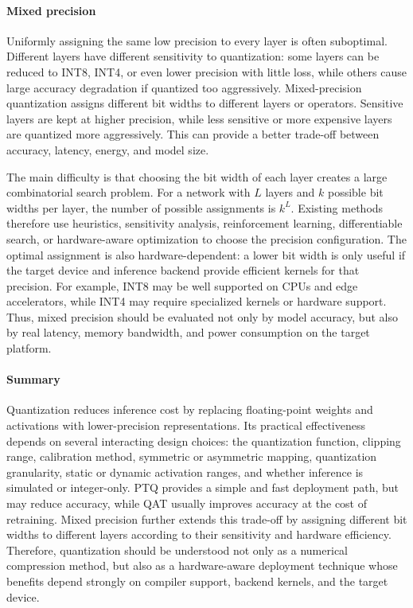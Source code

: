 \documentclass[12pt,a4paper]{report}
\begin{document}
\paragraph{Mixed precision}
Uniformly assigning the same low precision to every layer is often suboptimal. Different layers
have different sensitivity to quantization: some layers can be reduced to INT8, INT4, or even
lower precision with little loss, while others cause large accuracy degradation if quantized too
aggressively. Mixed-precision quantization assigns different bit widths to different layers or
operators. Sensitive layers are kept at higher precision, while less sensitive or more expensive
layers are quantized more aggressively. This can provide a better trade-off between accuracy,
latency, energy, and model size.

The main difficulty is that choosing the bit width of each layer creates a large combinatorial search
problem. For a network with $L$ layers and $k$ possible bit widths per layer, the number of
possible assignments is $k^L$. Existing methods therefore use heuristics, sensitivity analysis,
reinforcement learning, differentiable search, or hardware-aware optimization to choose the
precision configuration. The optimal assignment is also hardware-dependent: a lower bit width is
only useful if the target device and inference backend provide efficient kernels for that precision.
For example, INT8 may be well supported on CPUs and edge accelerators, while INT4 may require
specialized kernels or hardware support. Thus, mixed precision should be evaluated not only by
model accuracy, but also by real latency, memory bandwidth, and power consumption on the
target platform.

\paragraph{Summary}
Quantization reduces inference cost by replacing floating-point weights and activations with
lower-precision representations. Its practical effectiveness depends on several interacting design
choices: the quantization function, clipping range, calibration method, symmetric or asymmetric
mapping, quantization granularity, static or dynamic activation ranges, and whether inference is
simulated or integer-only. PTQ provides a simple and fast deployment path, but may reduce
accuracy, while QAT usually improves accuracy at the cost of retraining. Mixed precision further
extends this trade-off by assigning different bit widths to different layers according to their
sensitivity and hardware efficiency. Therefore, quantization should be understood not only as a
numerical compression method, but also as a hardware-aware deployment technique whose
benefits depend strongly on compiler support, backend kernels, and the target device.
\end{document}
